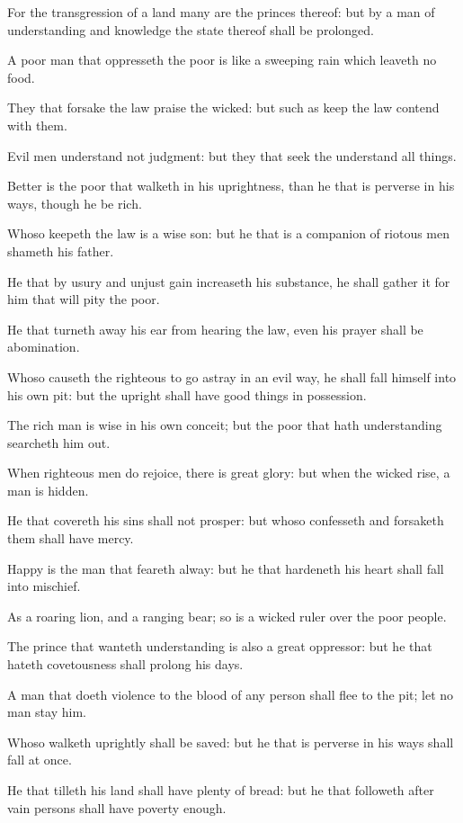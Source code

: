 \verse For the transgression of a land many are the princes thereof: but by a man of understanding and knowledge the state thereof shall be prolonged.

\verse A poor man that oppresseth the poor is like a sweeping rain which leaveth no food.

\verse They that forsake the law praise the wicked: but such as keep the law contend with them.

\verse Evil men understand not judgment: but they that seek the \LORD understand all things.

\verse Better is the poor that walketh in his uprightness, than he that is perverse in his ways, though he be rich.

\verse Whoso keepeth the law is a wise son: but he that is a companion of riotous men shameth his father.

\verse He that by usury and unjust gain increaseth his substance, he shall gather it for him that will pity the poor.

\verse He that turneth away his ear from hearing the law, even his prayer shall be abomination.

\verse Whoso causeth the righteous to go astray in an evil way, he shall fall himself into his own pit: but the upright shall have good things in possession.

\verse The rich man is wise in his own conceit; but the poor that hath understanding searcheth him out.

\verse When righteous men do rejoice, there is great glory: but when the wicked rise, a man is hidden.

\verse He that covereth his sins shall not prosper: but whoso confesseth and forsaketh them shall have mercy.

\verse Happy is the man that feareth alway: but he that hardeneth his heart shall fall into mischief.

\verse As a roaring lion, and a ranging bear; so is a wicked ruler over the poor people.

\verse The prince that wanteth understanding is also a great oppressor: but he that hateth covetousness shall prolong his days.

\verse A man that doeth violence to the blood of any person shall flee to the pit; let no man stay him.

\verse Whoso walketh uprightly shall be saved: but he that is perverse in his ways shall fall at once.

\verse He that tilleth his land shall have plenty of bread: but he that followeth after vain persons shall have poverty enough.

